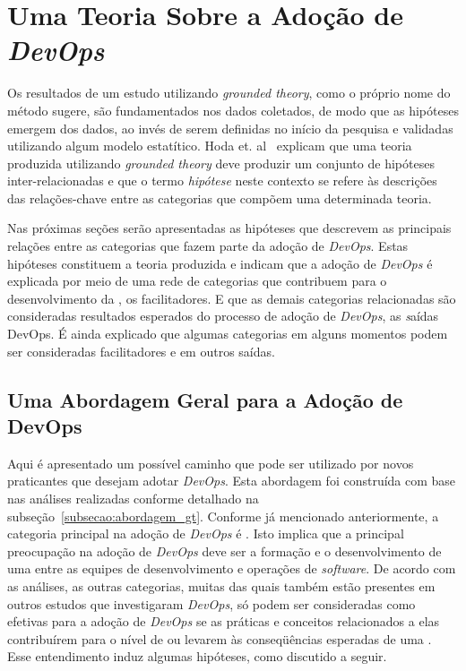 \section{Uma Teoria Sobre a Adoção de \textit{DevOps}}\label{secao_teoria}

Os resultados de um estudo utilizando {\it grounded theory}, como o próprio
nome do método sugere, são fundamentados nos dados coletados, de modo que as
hipóteses emergem dos dados, ao invés de serem definidas no início da pesquisa
e validadas utilizando algum modelo estatítico. Hoda et. al~\cite{hoda2017becoming}
explicam que uma teoria produzida utilizando \emph{grounded theory} deve produzir
um conjunto de hipóteses inter-relacionadas e que o termo \emph{hipótese} neste
contexto se refere às descrições das relações-chave entre as categorias que
compõem uma determinada teoria.

Nas próximas seções serão apresentadas as hipóteses que descrevem as principais
relações entre as categorias que fazem parte da adoção de {\it DevOps}. Estas
hipóteses constituem a teoria produzida e indicam que a adoção
de {\it DevOps} é explicada por meio de uma rede de categorias que contribuem
para o desenvolvimento da \cc, os facilitadores. E que as demais categorias
relacionadas são consideradas resultados esperados do processo de adoção de
{\it DevOps}, as {\emph saídas DevOps}. É ainda explicado que algumas categorias
em alguns momentos podem ser consideradas facilitadores e em outros saídas.

\subsection{Uma Abordagem Geral para a Adoção de DevOps}

Aqui é apresentado um possível caminho que pode ser utilizado por
novos praticantes que desejam adotar {\it DevOps}. Esta abordagem foi construída
com base nas análises realizadas conforme detalhado na subseção~\ref{subsecao:abordagem_gt}.
Conforme já mencionado anteriormente, a categoria principal na adoção de {\it DevOps}
é \cc. Isto implica que a principal preocupação na adoção de {\it DevOps} deve
ser a formação e o desenvolvimento de uma \cc entre as equipes de desenvolvimento
e operações de {\it software}. De acordo com as análises, as outras categorias,
muitas das quais também estão presentes em outros estudos que investigaram
{\it DevOps}, só podem ser consideradas como efetivas para a adoção de {\it DevOps}
se as práticas e conceitos relacionados a elas contribuírem para o nível de \cc
ou levarem às conseqüências esperadas de uma \cc. Esse entendimento induz algumas
hipóteses, como discutido a seguir.

